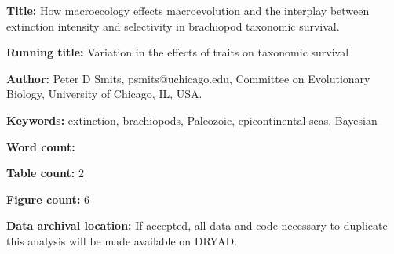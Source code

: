 \documentclass{article}
\begin{document}
\linenumbers
\modulolinenumbers[2]


\begin{titlepage}
  \begin{large}
    \textbf{Title:} How macroecology effects macroevolution and the interplay between extinction intensity and selectivity in brachiopod taxonomic survival.
  \end{large}

  \textbf{Running title:} Variation in the effects of traits on taxonomic survival

  \textbf{Author:} Peter D Smits, psmits@uchicago.edu, Committee on Evolutionary Biology, University of Chicago, IL, USA.

  \textbf{Keywords:} extinction, brachiopods, Paleozoic, epicontinental seas, Bayesian

  \textbf{Word count:} 
  
  \textbf{Table count:} 2
 
  \textbf{Figure count:} 6

  \textbf{Data archival location:} If accepted, all data and code necessary to duplicate this analysis will be made available on DRYAD.

\end{titlepage}
\end{document}
